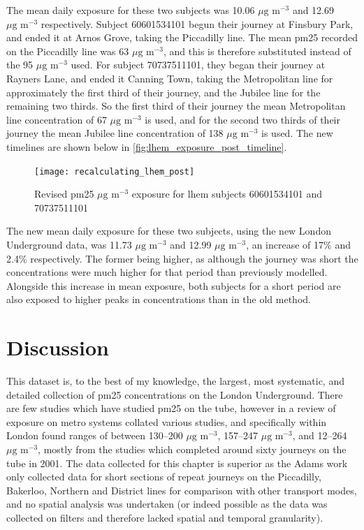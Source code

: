 The mean daily exposure for these two subjects was 10.06 $\mu \text{g m}^{-3}$ and 12.69 $\mu \text{g m}^{-3}$ respectively. Subject 60601534101 begun their journey at Finsbury Park, and ended it at Arnos Grove, taking the Piccadilly line. The mean \gls{pm25} recorded on the Piccadilly line was 63 $\mu \text{g m}^{-3}$, and this is therefore substituted instead of the 95 $\mu \text{g m}^{-3}$ used. For subject 70737511101, they began their journey at Rayners Lane, and ended it Canning Town, taking the Metropolitan line for approximately the first third of their journey, and the Jubilee line for the remaining two thirds. So the first third of their journey the mean Metropolitan line concentration of 67 $\mu \text{g m}^{-3}$ is used, and for the second two thirds of their journey the mean Jubilee line concentration of 138 $\mu \text{g m}^{-3}$ is used. The new timelines are shown below in \autoref{fig:lhem_exposure_post_timeline}.

\begin{figure}[H]
\centering
\texttt{[image: recalculating\_lhem\_post]}
\caption{Revised \gls{pm25} $\mu \text{g m}^{-3}$ exposure for \gls{lhem} subjects 60601534101 and 70737511101}
\label{fig:lhem_exposure_post_timeline}
\end{figure}

The new mean daily exposure for these two subjects, using the new London Underground data, was 11.73 $\mu \text{g m}^{-3}$ and 12.99 $\mu \text{g m}^{-3}$, an increase of 17\% and 2.4\% respectively. The former being higher, as although the journey was short the concentrations were much higher for that period than previously modelled. Alongside this increase in mean exposure, both subjects for a short period are also exposed to higher peaks in concentrations than in the old method.

\section{Discussion}
\label{sec:3Discussion}


This dataset is, to the best of my knowledge, the largest, most systematic, and detailed collection of \gls{pm25} concentrations on the London Underground. There are few studies which have studied \gls{pm25} on the tube, however in a review of exposure on metro systems  \cite{Nieuwenhuijsen2007} collated various studies, and specifically within London found ranges of between 130--200 $\mu \text{g m}^{-3}$, 157--247 $\mu \text{g m}^{-3}$, and 12--264 $\mu \text{g m}^{-3}$, mostly from the \cite{Adams2001a} studies which completed around sixty journeys on the tube in 2001. The data collected for this chapter is superior as the Adams work only collected data for short sections of repeat journeys on the Piccadilly, Bakerloo, Northern and District lines for comparison with other transport modes, and no spatial analysis was undertaken (or indeed possible as the data was collected on filters and therefore lacked spatial and temporal granularity). 

